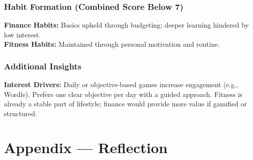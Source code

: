 \documentclass[12pt]{article}
\begin{document}
\subsubsection*{Habit Formation (Combined Score Below 7)}
\textbf{Finance Habits:} Basics upheld through budgeting; deeper learning hindered by low interest. \\
\textbf{Fitness Habits:} Maintained through personal motivation and routine.

\subsubsection*{Additional Insights}
\textbf{Interest Drivers:} Daily or objective-based games increase engagement (e.g., Wordle). Prefers one clear objective per day with a guided approach. Fitness is already a stable part of lifestyle; finance would provide more value if gamified or structured.



\newpage{}

\section{Appendix --- Reflection}


\end{document}
